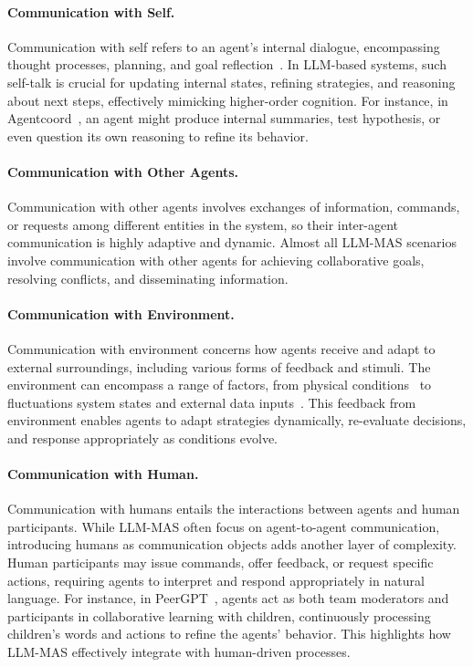 \paragraph{Communication with Self.} Communication with self refers to an agent's internal dialogue, encompassing thought processes, planning, and goal reflection~\cite{react}. In LLM-based systems, such self-talk is crucial for updating internal states, refining strategies, and reasoning about next steps, effectively mimicking higher-order cognition. For instance, in Agentcoord~\cite{agentcoord}, an agent might produce internal summaries, test hypothesis, or even question its own reasoning to refine its behavior.

\paragraph{Communication with Other Agents.} Communication with other agents involves exchanges of information, commands, or requests among different entities in the system, so their inter-agent communication is highly adaptive and dynamic. Almost all LLM-MAS scenarios involve communication with other agents for achieving collaborative goals, resolving conflicts, and disseminating information.

\paragraph{Communication with Environment.} Communication with environment concerns how agents receive and adapt to external surroundings, including various forms of feedback and stimuli. The environment can encompass a range of factors, from physical conditions~\cite{embodied_agents} to fluctuations system states and external data inputs~\cite{blockagents}. This feedback from environment enables agents to adapt strategies dynamically, re-evaluate decisions, and response appropriately as conditions evolve.

\paragraph{Communication with Human.} Communication with humans entails the interactions between agents and human participants. While LLM-MAS often focus on agent-to-agent communication, introducing humans as communication objects adds another layer of complexity. Human participants may issue commands, offer feedback, or request specific actions, requiring agents to interpret and respond appropriately in natural language. For instance, in PeerGPT~\cite{peergpt}, agents act as both team moderators and participants in collaborative learning with children, continuously processing children’s words and actions to refine the agents’ behavior. This highlights how LLM-MAS effectively integrate with human-driven processes.

